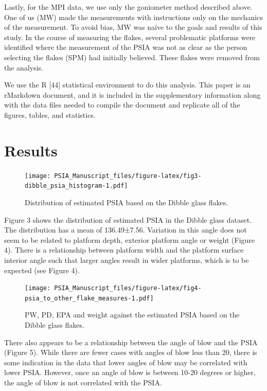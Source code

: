 \documentclass[10pt,letterpaper]{article}
\begin{document}
Lastly, for the MPI data, we use only the goniometer method described
above. One of us (MW) made the measurements with instructions only on
the mechanics of the measurement. To avoid bias, MW was naïve to the
goals and results of this study. In the course of measuring the flakes,
several problematic platforms were identified where the measurement of
the PSIA was not as clear as the person selecting the flakes (SPM) had
initially believed. These flakes were removed from the analysis.

We use the R {[}44{]} statistical environment to do this analysis. This
paper is an rMarkdown document, and it is included in the supplementary
information along with the data files needed to compile the document and
replicate all of the figures, tables, and statistics.

\hypertarget{results}{%
\section{Results}\label{results}}

\begin{figure}
\centering
\texttt{[image: PSIA\_Manuscript\_files/figure-latex/fig3-dibble\_psia\_histogram-1.pdf]}
\caption{Distribution of estimated PSIA based on the Dibble glass
flakes.}
\end{figure}

Figure 3 shows the distribution of estimated PSIA in the Dibble glass
dataset. The distribution has a mean of 136.49±7.56. Variation in this
angle does not seem to be related to platform depth, exterior platform
angle or weight (Figure 4). There is a relationship between platform
width and the platform surface interior angle such that larger angles
result in wider platforms, which is to be expected (see Figure 4).

\begin{figure}
\centering
\texttt{[image: PSIA\_Manuscript\_files/figure-latex/fig4-psia\_to\_other\_flake\_measures-1.pdf]}
\caption{PW, PD, EPA and weight against the estimated PSIA based on the
Dibble glass flakes.}
\end{figure}

There also appears to be a relationship between the angle of blow and
the PSIA (Figure 5). While there are fewer cases with angles of blow
less than 20, there is some indication in the data that lower angles of
blow may be correlated with lower PSIA. However, once an angle of blow
is between 10-20 degrees or higher, the angle of blow is not correlated
with the PSIA.
\end{document}
